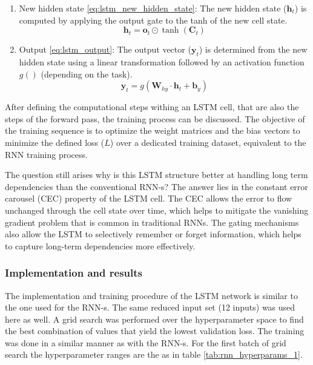 \begin{enumerate}
    \begin{equation}
        \mathbf{o}_t = \sigma(\mathbf{W}_{xo} \cdot \mathbf{x}_t + \mathbf{W}_{ho} \cdot \mathbf{h}_{t-1} + \mathbf{b}_o)
        \label{eq:lstm_output_gate}
    \end{equation}
    \item New hidden state \ref{eq:lstm_new_hidden_state}: The new hidden state ($\mathbf{h}_t$) is computed by applying the output gate to the tanh of the new cell state.
    \begin{equation}
        \mathbf{h}_t = \mathbf{o}_t \odot \tanh(\mathbf{C}_t)
        \label{eq:lstm_new_hidden_state}
    \end{equation}
    \item Output \ref{eq:lstm_output}: The output vector ($\mathbf{y}_t$) is determined from the new hidden state using a linear transformation followed by an activation function $g()$ (depending on the task).
    \begin{equation}
        \mathbf{y}_t = g(\mathbf{W}_{hy} \cdot \mathbf{h}_t + \mathbf{b}_y)
        \label{eq:lstm_output}
    \end{equation}
\end{enumerate}

After defining the computational steps withing an LSTM cell, that are also the steps of the forward pass, the training process can be discussed. The objective of the training sequence is to optimize the weight matrices and the bias vectors to minimize the defined loss ($L$) over a dedicated training dataset, equivalent to the RNN training process.

The question still arises why is this LSTM structure better at handling long term dependencies than the conventional RNN-s? The answer lies in the constant error carousel (CEC) property of the LSTM cell. The CEC allows the error to flow unchanged through the cell state over time, which helps to mitigate the vanishing gradient problem that is common in traditional RNNs. The gating mechanisms also allow the LSTM to selectively remember or forget information, which helps to capture long-term dependencies more effectively.

\subsubsection{Implementation and results}

The implementation and training procedure of the LSTM network is similar to the one used for the RNN-s. The same reduced input set (12 inputs) was used here as well. A grid search was performed over the hyperparameter space to find the best combination of values that yield the lowest validation loss. The training was done in a similar manner as with the RNN-s. For the first batch of grid search the hyperparameter ranges are the as in table \ref{tab:rnn_hyperparams_1}.

